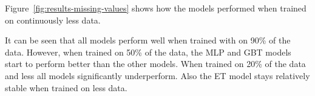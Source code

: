 
Figure~\ref{fig:results-missing-values} shows how the models performed when trained on
continuously less data.

It can be seen that all models perform well when trained with on 90\% of the data.
However, when trained on 50\% of the data, the \ac{MLP}  and \ac{GBT} models start to perform
better than the
other models.
When trained on 20\% of the data and less all models significantly underperform.
Also the \ac{ET} model stays relatively stable when trained on less data.

